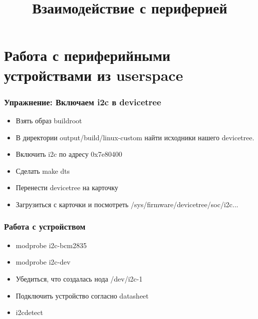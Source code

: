 

\title{Взаимодействие с периферией}



\begin{frame}
  \frametitle{}
\end{frame}

\section{Работа с периферийными устройствами из userspace}

\begin{frame}
  \frametitle{Упражнение: Включаем i2c в devicetree}
  \begin{itemize}
      \item Взять образ buildroot 
      \item В директории output/build/linux-custom найти исходники нашего devicetree.
      \item Включить i2c по адресу 0x7e80400
      \item Сделать make dts
      \item Перенести devicetree на карточку
      \item Загрузиться с карточки и посмотреть /sys/firmware/devicetree/soc/i2c...
  \end{itemize}
\end{frame}

\begin{frame}
  \frametitle{Работа с устройством}
  \begin{itemize}
      \item modprobe i2c-bcm2835
      \item modprobe i2c-dev
      \item Убедиться, что создалась нода /dev/i2c-1
      \item Подключить устройство согласно datasheet
      \item i2cdetect
  \end{itemize}
\end{frame}


